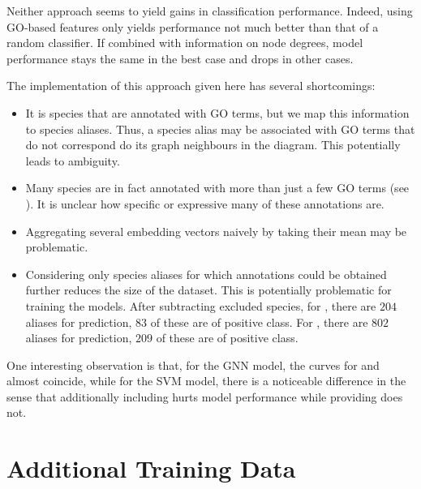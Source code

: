 \documentclass[
	fontsize=10pt, %
	twoside=false, %
	secnumdepth=1, %
  toc=indentunnumbered %
]{kaobook}
\begin{document}
Neither approach seems to yield gains in classification performance. Indeed,
using GO-based features only yields performance not much better than that of a
random classifier. If combined with information on node degrees, model
performance stays the same in the best case and drops in other cases.

The implementation of this approach given here has several shortcomings:
\begin{itemize}
  \item It is species that are annotated with GO terms, but we map this
    information to species aliases. Thus, a species alias may be associated with
    GO terms that do not correspond do its graph neighbours in the diagram. This
    potentially leads to ambiguity. 
\item Many species are in fact annotated with more than just a few GO terms (see
  ). It is unclear how specific or expressive many of
  these annotations are.
\item Aggregating several embedding vectors naively by taking their mean may be problematic.
\item Considering only species aliases for which annotations could be obtained
  further reduces the size of the dataset. This is potentially problematic for
  training the models. After subtracting excluded species, for \ADLast, there
  are $204$ aliases for prediction, $83$ of these are of positive class. For
  \PDMap{}, there are $802$ aliases for prediction, $209$ of these are of positive class.
\end{itemize}

One interesting observation is that, for the GNN model, the curves for
 and  almost coincide, while for the SVM
model, there is a noticeable difference in the sense that additionally including
 hurts model performance while providing 
does not.







\section{Additional Training Data}
\end{document}
